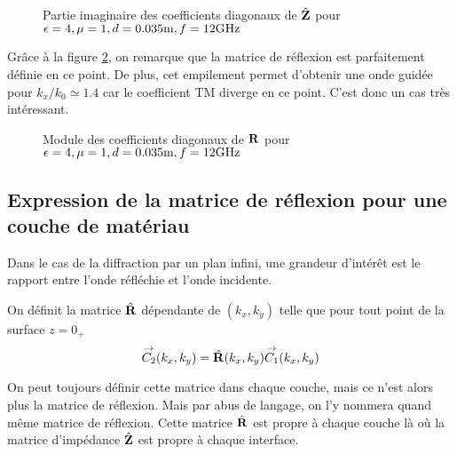         \begin{figure}[!hbt]
            \centering
            
            \caption[Reproduction résultat P. Soudais p.~11]{Partie imaginaire des coefficients diagonaux de \(\hat{\mathbf{Z}}\) pour \(\epsilon = 4, \mu = 1, d=0.035\text{m}, f=12\text{GHz}\)}
            \label{fig:imp_fourier:plan:soudais}
        \end{figure}


        Grâce à la figure \ref{fig:reflex_fourier:plan:soudais}, on remarque que la matrice de réflexion est parfaitement définie en ce point. De plus, cet empilement permet d'obtenir une onde guidée pour \(k_x\slash k_0 \simeq 1.4\) car le coefficient TM diverge en ce point. C'est donc un cas très intéressant.

        \begin{figure}[!hbt]
            \centering
            
            \caption[Reproduction résultat P. Soudais p.~11]{Module des coefficients diagonaux de \(\mathbf{R}\) pour \(\epsilon = 4, \mu = 1, d=0.035\text{m}, f=12\text{GHz}\)}
            \label{fig:reflex_fourier:plan:soudais}
        \end{figure}


    \subsection{Expression de la matrice de réflexion pour une couche de matériau}

        Dans le cas de la diffraction par un plan infini, une grandeur d’intérêt est le rapport entre l'onde réfléchie et l'onde incidente.
         
        \begin{defn}
          On définit la matrice \(\hat{\mathbf{R}}\) dépendante de \((k_x,k_y)\) telle que pour tout point de la surface \(z=0_+\)
          \begin{equation}
            {\overset{\rightarrow}{C_2}}(k_x,k_y)  = \hat{\mathbf{R}}(k_x,k_y) {\overset{\rightarrow}{C_1}}(k_x,k_y)
          \end{equation}
        \end{defn}

        On peut toujours définir cette matrice dans chaque couche, mais ce n'est alors plus la matrice de réflexion. Mais par abus de langage, on l'y nommera quand même matrice de réflexion.
        Cette matrice \(\hat{\mathbf{R}}\) est propre à chaque couche là où la matrice d'impédance \(\hat{\mathbf{Z}}\) est propre à chaque interface.

